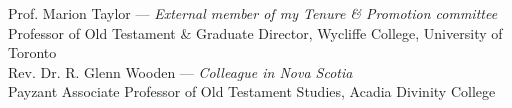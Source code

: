 \documentclass[11pt]{article}
\begin{document}

Prof. Marion Taylor --- \emph{External member of my Tenure \& Promotion committee}\\
Professor of Old Testament \& Graduate Director, Wycliffe College, University of Toronto\\

Rev. Dr. R. Glenn Wooden --- \emph{Colleague in Nova Scotia}\\
Payzant Associate Professor of Old Testament Studies, Acadia Divinity College\\


\end{document}
